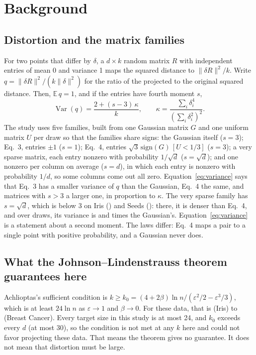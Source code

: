 \section{Background}
\label{sec:background}

\subsection{Distortion and the matrix families}

For two points that differ by $\delta$, a $d \times k$ random matrix $R$ with independent entries of mean 0 and variance 1 maps the squared distance to $\lVert \delta R\rVert^2 / k$. Write $q = \lVert \delta R\rVert^2 / (k\lVert\delta\rVert^2)$ for the ratio of the projected to the original squared distance. Then, $\mathbb{E}\,q = 1$, and if the entries have fourth moment $s$,
\begin{equation}
\operatorname{Var}(q) = \frac{2 + (s - 3)\,\kappa}{k}, \qquad \kappa = \frac{\sum_i \delta_i^4}{(\sum_i \delta_i^2)^2}. \label{eq:variance}
\end{equation}
The study uses five families, built from one Gaussian matrix $G$ and one uniform matrix $U$ per draw so that the families share signs: the Gaussian itself ($s = 3$); Eq.~3, entries $\pm 1$ ($s = 1$); Eq.~4, entries $\sqrt{3}\,\mathrm{sign}(G)\,[U < 1/3]$ ($s = 3$); a very sparse matrix, each entry nonzero with probability $1/\sqrt{d}$ ($s = \sqrt{d}$); and one nonzero per column on average ($s = d$), in which each entry is nonzero with probability $1/d$, so some columns come out all zero. Equation~\eqref{eq:variance} says that Eq.~3 has a smaller variance of $q$ than the Gaussian, Eq.~4 the same, and matrices with $s > 3$ a larger one, in proportion to $\kappa$. The very sparse family has $s = \sqrt{d}$, which is below 3 on Iris () and Seeds (): there, it is denser than Eq.~4, and over  draws, its variance is  and  times the Gaussian's. Equation~\eqref{eq:variance} is a statement about a second moment. The laws differ: Eq.~4 maps a pair to a single point with positive probability, and a Gaussian never does.

\subsection{What the Johnson--Lindenstrauss theorem guarantees here}

Achlioptas's sufficient condition is $k \ge k_0 = (4 + 2\beta)\ln n / (\varepsilon^2/2 - \varepsilon^3/3)$, which is at least $24 \ln n$ as $\varepsilon \to 1$ and $\beta \to 0$. For these data, that is  (Iris) to  (Breast Cancer). Every target size in this study is at most 24, and $k_0$ exceeds every $d$ (at most 30), so the condition is not met at any $k$ here and could not favor projecting these data. That means the theorem gives no guarantee. It does not mean that distortion must be large.

